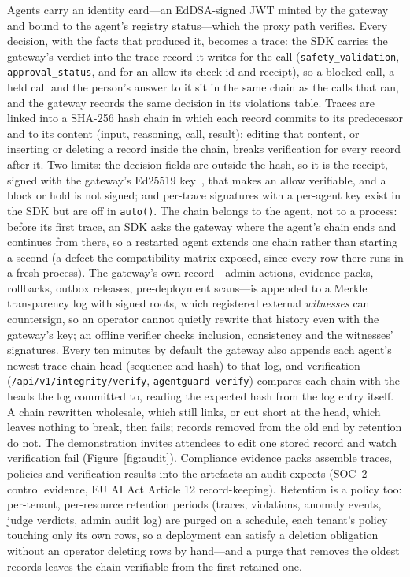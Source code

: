 \documentclass[sigconf,nonacm]{acmart}
\begin{document}
Agents carry an identity card---an EdDSA-signed JWT minted by the gateway
and bound to the agent's registry status---which the proxy path verifies.
Every decision, with the facts that produced it, becomes a trace: the
SDK carries the gateway's verdict into the trace record it writes for
the call (\texttt{safety\_validation}, \texttt{approval\_status}, and
for an allow its check id and receipt), so a blocked call, a held call
and the person's answer to it sit in the same chain as the calls that
ran, and the gateway records the same decision in its violations table.
Traces are linked into a SHA-256 hash chain in which each record commits
to its predecessor and to its content (input, reasoning, call, result);
editing that content, or inserting or deleting a record inside the
chain, breaks verification for every record after it. Two limits: the
decision fields are outside the hash, so it is the receipt, signed with
the gateway's Ed25519 key~\cite{bernstein2012eddsa}, that makes an
allow verifiable, and a block or hold is not signed; and per-trace
signatures with a per-agent key exist in the SDK but are off in
\texttt{auto()}. The chain belongs to the agent, not to a process: before
its first trace, an SDK asks the gateway where the agent's chain ends and
continues from there, so a restarted agent extends one chain rather than
starting a second (a defect the compatibility matrix exposed, since every
row there runs in a fresh process). The gateway's own record---admin
actions, evidence packs, rollbacks, outbox releases, pre-deployment
scans---is appended to a Merkle transparency log with signed roots, which
registered external \emph{witnesses} can countersign, so an operator
cannot quietly rewrite that history even with the gateway's key; an
offline verifier checks inclusion, consistency and the witnesses'
signatures. Every ten minutes by default the gateway also appends each agent's newest trace-chain head (sequence and hash) to that log, and verification (\texttt{/api/v1/integrity/verify}, \texttt{agentguard verify}) compares each chain with the heads the log committed to, reading the expected hash from the log entry itself. A chain rewritten wholesale, which still links, or cut short at the head, which leaves nothing to break, then fails; records removed from the old end by retention do not. The demonstration invites
attendees to edit one stored record and watch verification fail
(Figure~\ref{fig:audit}). Compliance evidence packs assemble
traces, policies and verification results into the artefacts an audit
expects (SOC~2 control evidence, EU AI Act Article 12 record-keeping).
Retention is a policy too: per-tenant, per-resource retention periods
(traces, violations, anomaly events, judge verdicts, admin audit log)
are purged on a schedule, each tenant's policy touching only its own
rows, so a deployment can satisfy a deletion
obligation without an operator deleting rows by hand---and a purge that
removes the oldest records leaves the chain verifiable from the first
retained one.
\end{document}
